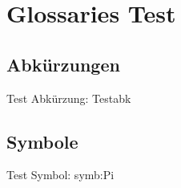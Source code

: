 \chapter{Glossaries Test}
\section{Abkürzungen}
Test Abkürzung: \gls{Testabk}
\section{Symbole}
Test Symbol: \gls{symb:Pi}

